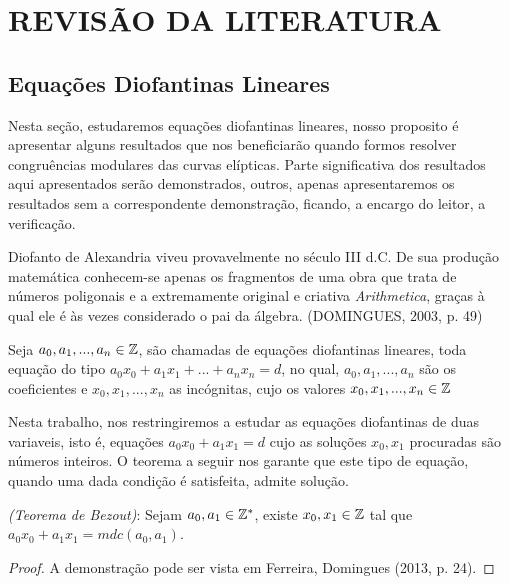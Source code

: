 \section{REVISÃO DA LITERATURA}

	\subsection{Equações Diofantinas Lineares} \label{subsec:diofantinas}
	
	Nesta seção, estudaremos equações diofantinas lineares, nosso proposito é apresentar alguns resultados que nos beneficiarão quando formos resolver congruências modulares das curvas elípticas. Parte significativa dos resultados aqui apresentados serão demonstrados, outros, apenas apresentaremos os resultados sem a correspondente demonstração, ficando, a encargo do leitor, a verificação.
	
	\begin{CitacaoLonga}
		Diofanto de Alexandria viveu provavelmente no século III d.C. De sua produção matemática conhecem-se apenas os fragmentos de uma obra que trata de números poligonais e a extremamente original e criativa \textit{Arithmetica}, graças à qual ele é às vezes considerado o pai da álgebra. (DOMINGUES, 2003, p. 49)
	\end{CitacaoLonga}

	\begin{definicao}
		Seja $a_0, a_1, ..., a_n \in \mathbb{Z}$, são chamadas de equações diofantinas lineares, toda equação do tipo $a_0x_0 + a_1x_1 + ... + a_nx_n = d$, no qual, $a_0, a_1, ..., a_n$ são os coeficientes e $x_0, x_1, ..., x_n$ as incógnitas, cujo os valores $x_0, x_1, ..., x_n \in \mathbb{Z}$ 
	\end{definicao}

	Nesta trabalho, nos restringiremos a estudar as equações diofantinas de duas variaveis, isto é, equações $a_0x_0 + a_1x_1 = d$ cujo as soluções $x_0, x_1$ procuradas são números inteiros. O teorema a seguir nos garante que este tipo de equação, quando uma dada condição é satisfeita, admite solução.
	
	\begin{teorema}
	 \textit{(Teorema de Bezout)}: Sejam $a_0, a_1 \in \mathbb{Z}^*$, existe $x_0, x_1 \in \mathbb{Z}$ tal que $a_0x_0 + a_1x_1 = mdc(a_0, a_1)$.
	\end{teorema}

	\begin{proof}
	A demonstração pode ser vista em Ferreira, Domingues (2013, p. 24).
	\end{proof}

